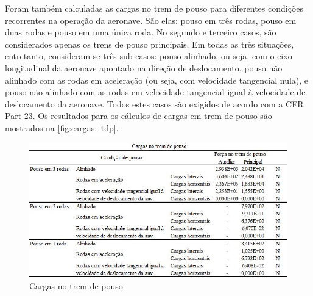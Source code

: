 Foram também calculadas as cargas no trem de pouso para diferentes condições recorrentes na operação da aeronave. São elas: pouso em três rodas, pouso em duas rodas e pouso em uma única roda. No segundo e terceiro casos, são considerados apenas os trens de pouso principais. Em todas as três situações, entretanto, consideram-se três sub-casos: pouso alinhado, ou seja, com o eixo longitudinal da aeronave apontado na direção de deslocamento, pouso não alinhado com as rodas em aceleração (ou seja, com velocidade tangencial nula), e pouso não alinhado com as rodas em velocidade tangencial igual à velocidade de deslocamento da aeronave. Todos estes casos são exigidos de acordo com a CFR Part 23.
Os resultados para os cálculos de cargas em trem de pouso são mostrados na \autoref{fig:cargas_tdp}.

\begin{figure}
\centering
\includegraphics[width=\textwidth]{cargas/imagens/Cargas_tdp.jpg}
\caption{Cargas no trem de pouso}
\label{fig:cargas_tdp}
\end{figure}
